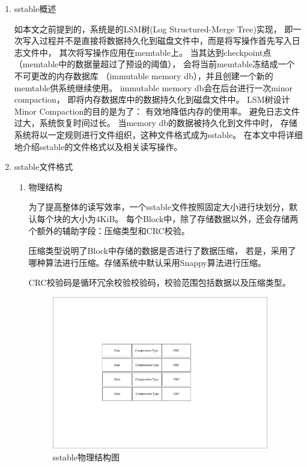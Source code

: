 			\begin{enumerate}
				\item sstable概述
				
				如本文之前提到的，系统是的LSM树(Log Structured-Merge Tree)实现，
				即一次写入过程并不是直接将数据持久化到磁盘文件中，而是将写操作首先写入日志文件中，
				其次将写操作应用在memtable上。
				当其达到checkpoint点（memtable中的数据量超过了预设的阈值），
				会将当前memtable冻结成一个不可更改的内存数据库
				（immutable memory db），并且创建一个新的memtable供系统继续使用。
				immutable memory db会在后台进行一次minor compaction，
				即将内存数据库中的数据持久化到磁盘文件中。
				LSM树设计Minor Compaction的目的是为了：
				有效地降低内存的使用率。
				避免日志文件过大，系统恢复时间过长。
				当memory db的数据被持久化到文件中时，
				存储系统将以一定规则进行文件组织，这种文件格式成为sstable。
				在本文中将详细地介绍sstable的文件格式以及相关读写操作。

				\item sstable文件格式
				

				\begin{enumerate}
					\item 物理结构

					为了提高整体的读写效率，一个sstable文件按照固定大小进行块划分，默认每个块的大小为4KiB。
					每个Block中，除了存储数据以外，还会存储两个额外的辅助字段：压缩类型和CRC校验。
	
					压缩类型说明了Block中存储的数据是否进行了数据压缩，
					若是，采用了哪种算法进行压缩。存储系统中默认采用Snappy算法进行压缩。
	
					CRC校验码是循环冗余校验校验码，校验范围包括数据以及压缩类型。
					
					\begin{figure}[H]
						\centering
						\includegraphics[width=0.95\textwidth]{pdf/sstable_physic.pdf}
						\caption{sstable物理结构图}
						\label{sstable_physic}
					\end{figure}
					

\end{enumerate}
\end{enumerate}
